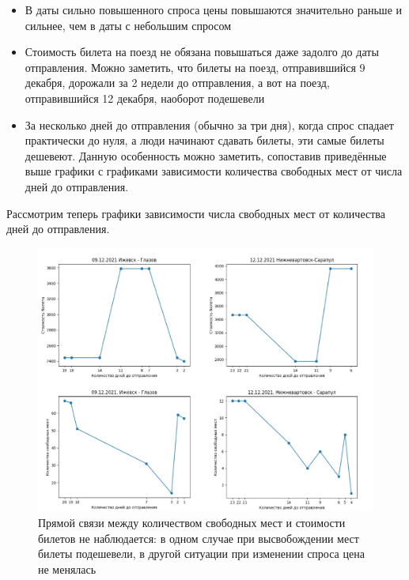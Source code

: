 \documentclass[conference]{IEEEtran}
\begin{document}
\begin{itemize}
	\item В даты сильно повышенного спроса цены повышаются значительно раньше и сильнее, чем в даты с небольшим спросом
	
	\item Стоимость билета на поезд не обязана повышаться даже задолго до даты отправления. Можно заметить, что билеты на поезд, отправившийся 9 декабря, дорожали за 2 недели до отправления, а вот на поезд, отправившийся 12 декабря, наоборот подешевели
	
	\item За несколько дней до отправления (обычно за три дня), когда спрос спадает практически до нуля, а люди начинают сдавать билеты, эти самые билеты дешевеют. Данную особенность можно заметить, сопоставив приведённые выше графики с графиками зависимости количества свободных мест от числа дней до отправления.
\end{itemize}

Рассмотрим теперь графики зависимости числа свободных мест от количества дней до отправления.

\begin{figure}[h]
	\includegraphics[scale=0.25]{4pict}
	\caption{Прямой связи между количеством свободных мест и стоимости билетов не наблюдается: в одном случае при высвобождении мест билеты подешевели, в другой ситуации при изменении спроса цена не менялась}
\end{figure}
\end{document}
